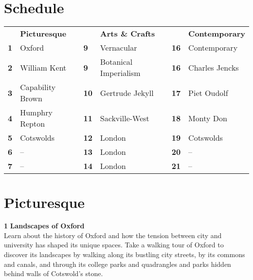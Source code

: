 \documentclass[11pt,article,oneside]{memoir}
\begin{document}
\vspace*{0.5em}

\section{Schedule}

\begin{table}[H]
\begin{tabular}{l l @{\hskip 0.5cm} l l @{\hskip 0.5cm} l l}
\small
& \textbf{Picturesque} & & \textbf{Arts \& Crafts} & & \textbf{Contemporary} \\
\textbf{1} & Oxford & \textbf{9} & Vernacular & \textbf{16} & Contemporary\\
\textbf{2} & William Kent & \textbf{9} & Botanical Imperialism & \textbf{16} & Charles Jencks\\
\textbf{3} & Capability Brown & \textbf{10} & Gertrude Jekyll & \textbf{17} & Piet Oudolf\\
\textbf{4} & Humphry Repton  & \textbf{11} & Sackville-West & \textbf{18} & Monty Don\\
\textbf{5} & Cotswolds & \textbf{12} & London  & \textbf{19} & Cotswolds\\
\textbf{6} & -- & \textbf{13} & London & \textbf{20} & --\\
\textbf{7} & -- & \textbf{14} & London  & \textbf{21} & --\\
\end{tabular}
\end{table}

\clearpage


\section{Picturesque}

\vspace*{0.em}

\noindent \textbf{1} 
\enspace
\textbf{Landscapes of Oxford}
\\
\noindent
Learn about the history of Oxford 
and how the tension between city and university
has shaped its unique spaces.
%
Take a walking tour of Oxford
to discover its landscapes by walking 
along its bustling city streets,
by its commons and canals, 
and through its college parks and quadrangles and parks
hidden behind walls of Cotswold's stone.
\\
\end{document}
